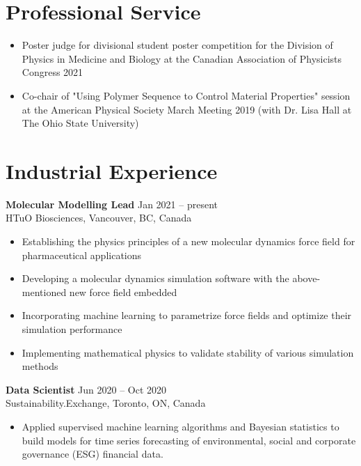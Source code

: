 \documentclass[11pt]{../yhlcv}
\begin{document}
\section*{Professional Service}
\begin{itemize}[leftmargin=*]\itemsep-0.2em
\item Poster judge for divisional student poster competition for the Division of Physics in Medicine and Biology at the Canadian Association of Physicists Congress 2021

\item Co-chair of "Using Polymer Sequence to Control Material Properties" session at the American Physical Society March Meeting 2019 (with Dr. Lisa Hall at The Ohio State University)
\end{itemize}


\section*{Industrial Experience}

{\bf Molecular Modelling Lead}  \hfill Jan 2021 -- present \vspace{0.25em} \\
HTuO Biosciences, Vancouver, BC, Canada 
\vspace{-0.7em} \\
\begin{itemize}[leftmargin=*]\itemsep-0.2em
\item Establishing the physics principles of a new molecular dynamics force field for pharmaceutical applications
\item Developing a molecular dynamics simulation software with the above-mentioned new force field embedded
\item Incorporating machine learning to parametrize force fields and optimize their simulation performance
\item Implementing mathematical physics to validate stability of various simulation methods
\end{itemize}

{\bf Data Scientist} \hfill Jun 2020 -- Oct 2020 \vspace{0.25em} \\
Sustainability.Exchange, Toronto, ON, Canada
\vspace{-0.7em}\\
\begin{itemize}[leftmargin=*]\itemsep-0.2em
\item Applied supervised machine learning algorithms and Bayesian statistics to build models for time series
forecasting of environmental, social and corporate governance (ESG) financial data.
\end{itemize}
\end{document}
